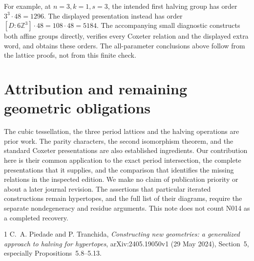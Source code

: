 \documentclass[11pt,a4paper]{article}
\newcommand{\Z}{\mathbb Z}
\begin{document}
For example, at $n=3,k=1,s=3$, the intended first halving group
has order $3^3\cdot48=1296$. The displayed presentation instead
has order $[D:6\Z^3]\cdot48=108\cdot48=5184$.
The accompanying small diagnostic constructs both affine groups
directly, verifies every Coxeter relation and the displayed extra
word, and obtains these orders. The all-parameter conclusions
above follow from the lattice proofs, not from this finite check.

\section{Attribution and remaining geometric obligations}
The cubic tessellation, the three period lattices and the
halving operations are prior work. The parity characters,
the second isomorphism theorem, and the standard Coxeter
presentations are also established ingredients. Our contribution
here is their common application to the exact period intersection,
the complete presentations that it supplies, and the comparison
that identifies the missing relations in the inspected edition.
We make no claim of publication priority or about a later journal
revision. The assertions that particular iterated constructions
remain hypertopes, and the full list of their diagrams, require
the separate nondegeneracy and residue arguments. This note
does not count N014 as a completed recovery.

\begin{thebibliography}{1}
 C.~A. Piedade and P. Tranchida,
\emph{Constructing new geometries: a generalized approach to
halving for hypertopes}, arXiv:2405.19050v1 (29 May 2024),
Section~5, especially Propositions~5.8--5.13.
\end{thebibliography}
\end{document}
